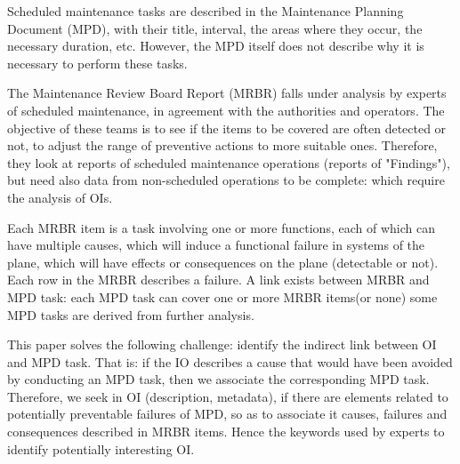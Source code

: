\documentclass[runningheads,a4paper]{{llncs}}
\begin{document}
Scheduled maintenance tasks are described in the Maintenance Planning Document (MPD), with their title, interval, the areas where they occur, the necessary duration, etc. However, the MPD itself does not describe why it is necessary to perform these tasks.


The Maintenance Review Board Report (MRBR) falls under analysis by experts of scheduled maintenance, in agreement with the authorities and operators. The objective of these teams is to see if the items to be covered are often detected or not, to adjust the range of preventive actions to more suitable ones. Therefore, they look at reports of scheduled maintenance operations (reports of "Findings"), but need also data from non-scheduled operations to be complete: which require the analysis of OIs.

Each MRBR item is a task involving one or more functions, each of which can have multiple causes, which will induce a functional failure in systems of the plane, which will have effects or consequences on the plane (detectable or not). Each row in the MRBR describes a failure. A link exists between MRBR and MPD task: each MPD task can cover one or more MRBR items(or none) some MPD tasks are derived from further analysis. 


This paper solves the following challenge: identify the indirect link between OI and MPD task. That is: if the IO describes a cause that would have been avoided by conducting an MPD task, then we associate the corresponding MPD task. Therefore, we seek in OI (description, metadata), if there are elements related to potentially preventable failures of MPD, so as to associate it causes, failures and consequences described in MRBR items. Hence the keywords used by experts to identify potentially interesting OI.
\end{document}
